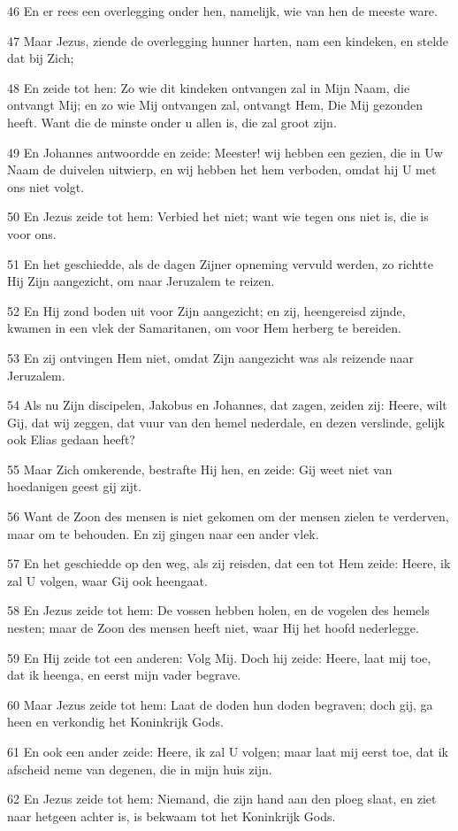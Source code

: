 \par 46 En er rees een overlegging onder hen, namelijk, wie van hen de meeste ware.
\par 47 Maar Jezus, ziende de overlegging hunner harten, nam een kindeken, en stelde dat bij Zich;
\par 48 En zeide tot hen: Zo wie dit kindeken ontvangen zal in Mijn Naam, die ontvangt Mij; en zo wie Mij ontvangen zal, ontvangt Hem, Die Mij gezonden heeft. Want die de minste onder u allen is, die zal groot zijn.
\par 49 En Johannes antwoordde en zeide: Meester! wij hebben een gezien, die in Uw Naam de duivelen uitwierp, en wij hebben het hem verboden, omdat hij U met ons niet volgt.
\par 50 En Jezus zeide tot hem: Verbied het niet; want wie tegen ons niet is, die is voor ons.
\par 51 En het geschiedde, als de dagen Zijner opneming vervuld werden, zo richtte Hij Zijn aangezicht, om naar Jeruzalem te reizen.
\par 52 En Hij zond boden uit voor Zijn aangezicht; en zij, heengereisd zijnde, kwamen in een vlek der Samaritanen, om voor Hem herberg te bereiden.
\par 53 En zij ontvingen Hem niet, omdat Zijn aangezicht was als reizende naar Jeruzalem.
\par 54 Als nu Zijn discipelen, Jakobus en Johannes, dat zagen, zeiden zij: Heere, wilt Gij, dat wij zeggen, dat vuur van den hemel nederdale, en dezen verslinde, gelijk ook Elias gedaan heeft?
\par 55 Maar Zich omkerende, bestrafte Hij hen, en zeide: Gij weet niet van hoedanigen geest gij zijt.
\par 56 Want de Zoon des mensen is niet gekomen om der mensen zielen te verderven, maar om te behouden. En zij gingen naar een ander vlek.
\par 57 En het geschiedde op den weg, als zij reisden, dat een tot Hem zeide: Heere, ik zal U volgen, waar Gij ook heengaat.
\par 58 En Jezus zeide tot hem: De vossen hebben holen, en de vogelen des hemels nesten; maar de Zoon des mensen heeft niet, waar Hij het hoofd nederlegge.
\par 59 En Hij zeide tot een anderen: Volg Mij. Doch hij zeide: Heere, laat mij toe, dat ik heenga, en eerst mijn vader begrave.
\par 60 Maar Jezus zeide tot hem: Laat de doden hun doden begraven; doch gij, ga heen en verkondig het Koninkrijk Gods.
\par 61 En ook een ander zeide: Heere, ik zal U volgen; maar laat mij eerst toe, dat ik afscheid neme van degenen, die in mijn huis zijn.
\par 62 En Jezus zeide tot hem: Niemand, die zijn hand aan den ploeg slaat, en ziet naar hetgeen achter is, is bekwaam tot het Koninkrijk Gods.

